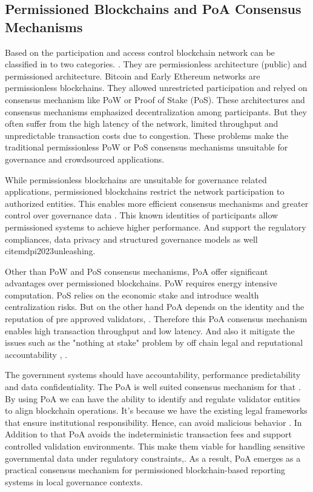 \subsection{Permissioned Blockchains and \ac{PoA} Consensus Mechanisms}

Based on the participation and access control blockchain network can be classified in to two categories.  \cite{und2026commledger}. They are permissionless architecture (public) and permissioned architecture. Bitcoin and Early Ethereum networks are permissionless blockchains. They allowed unrestricted participation and relyed on consensus mechanism like \ac{PoW} or Proof of Stake (\ac{PoS})\cite{mdpi2023survey}. These architectures and consensus mechanisms emphasized decentralization among participants. But they often suffer from the high latency of the network, limited throughput and unpredictable transaction costs due to congestion. These problems make the traditional permissionless PoW or PoS consensus mechanisms unsuitable for governance and crowdsourced applications\cite{arxiv2024performance}.

While permissionless blockchains are unsuitable for governance related applications, permissioned blockchains restrict the network participation to authorized entities. This enables more efficient consensus mechanisms and greater control over governance data \cite{und2026commledger}. This known identities of participants allow permissioned systems to achieve higher performance. And support the regulatory compliances, data privacy and structured governance models as well cite{mdpi2023unleashing}.

Other than \ac{PoW} and \ac{PoS} consensus mechanisms, \ac{PoA} offer significant advantages over permissioned blockchains. \ac{PoW} requires energy intensive computation. \ac{PoS} relies on the economic stake and introduce wealth centralization risks. But on the other hand \ac{PoA} depends on the identity and the reputation of pre approved validators\cite{researchgate2020survey}, \cite{zebpay2026poa}. Therefore this \ac{PoA} consensus mechanism enables high transaction throughput and low latency. And also it mitigate the issues such as the "nothing at stake" problem by off chain legal and reputational accountability \cite{echo2026poa}, \cite{grokipedia2026poa}.

The government systems should have accountability, performance predictability and data confidentiality. The \ac{PoA} is well suited consensus mechanism for that \cite{onekey2026poa}. By using \ac{PoA} we can have the ability to identify and regulate validator entities to align blockchain operations. It's because we have the existing legal frameworks that ensure institutional responsibility. Hence, can avoid malicious behavior \cite{hep2023governance}. In Addition to that PoA avoids the indeterministic transaction fees and support controlled validation environments. This make them viable for handling sensitive governmental data under regulatory constraints\cite{zebpay2026poa},\cite{mdpi2023unleashing}. As a result, \ac{PoA} emerges as a practical consensus mechanism for permissioned blockchain-based reporting systems in local governance contexts.

